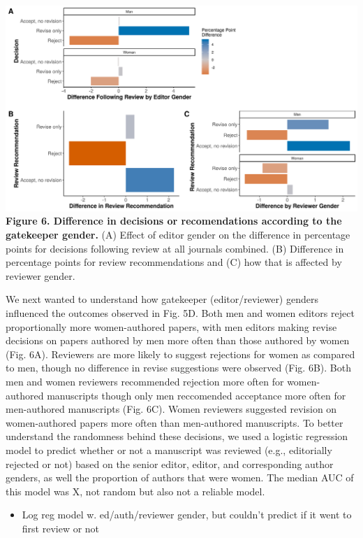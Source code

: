\documentclass[11pt,]{article}
\providecommand{\tightlist}{%
  \setlength{\itemsep}{0pt}\setlength{\parskip}{0pt}}
\begin{document}
\includegraphics{Figure_6.png} \textbf{Figure 6. Difference in decisions
or recomendations according to the gatekeeper gender.} (A) Effect of
editor gender on the difference in percentage points for decisions
following review at all journals combined. (B) Difference in percentage
points for review recommendations and (C) how that is affected by
reviewer gender.

We next wanted to understand how gatekeeper (editor/reviewer) genders
influenced the outcomes observed in Fig. 5D. Both men and women editors
reject proportionally more women-authored papers, with men editors
making revise decisions on papers authored by men more often than those
authored by women (Fig. 6A). Reviewers are more likely to suggest
rejections for women as compared to men, though no difference in revise
suggestions were observed (Fig. 6B). Both men and women reviewers
recommended rejection more often for women-authored manuscripts though
only men reccomended acceptance more often for men-authored manuscripts
(Fig. 6C). Women reviewers suggested revision on women-authored papers
more often than men-authored manuscripts. To better understand the
randomness behind these decisions, we used a logistic regression model
to predict whether or not a manuscript was reviewed (e.g., editorially
rejected or not) based on the senior editor, editor, and corresponding
author genders, as well the proportion of authors that were women. The
median AUC of this model was X, not random but also not a reliable
model.

\begin{itemize}
\tightlist
\item
  Log reg model w. ed/auth/reviewer gender, but couldn't predict if it
  went to first review or not
\end{itemize}
\end{document}
